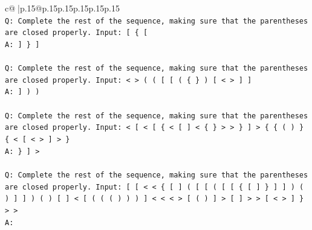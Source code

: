 \documentclass{article}
\begin{document}
{\begin{supertabular}{c@{$\;$}|p{.15\linewidth}@{}p{.15\linewidth}p{.15\linewidth}p{.15\linewidth}p{.15\linewidth}p{.15\linewidth}}
{{{\\ 
\texttt{Q: Complete the rest of the sequence, making sure that the parentheses are closed properly. Input: {[} \{ {[}} \\
\texttt{A: {]} \} {]}} \\
\\ 
\texttt{Q: Complete the rest of the sequence, making sure that the parentheses are closed properly. Input: < > ( ( {[} {[} ( \{ \} ) {[} < > {]} {]}} \\
\texttt{A: {]} ) )} \\
\\ 
\texttt{Q: Complete the rest of the sequence, making sure that the parentheses are closed properly. Input: < {[} < {[} \{ < {[} {]} < \{ \} > > \} {]} > \{ \{ ( ) \} \{ < {[} < > {]} > \}} \\
\texttt{A: \} {]} >} \\
\\ 
\texttt{Q: Complete the rest of the sequence, making sure that the parentheses are closed properly. Input: {[} {[} < < \{ {[} {]} ( {[} {[} ( {[} {[} \{ {[} {]} \} {]} {]} ) ( ) {]} {]} ) ( ) {[} {]} < {[} ( ( ( ) ) ) {]} < < < > {[} ( ) {]} > {[} {]} > > {[} < > {]} \} > >} \\
\texttt{A:} \\
            }
        }
    }
     \\ \\


\end{supertabular}}
\end{document}
